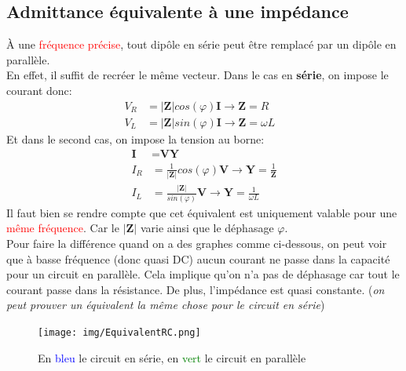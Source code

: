 \documentclass{report}
\begin{document}
\subsection{Admittance équivalente à une impédance}
À une \textcolor{red}{fréquence précise}, tout dipôle en série peut être remplacé par un dipôle en parallèle.\\

En effet, il suffit de recréer le même vecteur. Dans le cas en \textbf{série}, on impose le courant donc:
\begin{align}
\textbf{$V_{R}$} &= |\textbf{Z}|cos(\varphi) \textbf{I} \rightarrow \textbf{Z} = R\\
\textbf{$V_{L}$} &= |\textbf{Z}|sin(\varphi) \textbf{I} \rightarrow \textbf{Z} = \omega L&
\end{align}
Et dans le second cas, on impose la tension au borne:
\begin{align}
\textbf{I} &= \textbf{V} \textbf{Y}\\
\textbf{$I_{R}$} &= \frac{1}{|\textbf{Z}|}cos(\varphi) \textbf{V} \rightarrow \textbf{Y} = \frac{1}{\textbf{Z}}\\
\textbf{$I_{L}$} &= \frac{|\textbf{Z}|}{sin(\varphi)} \textbf{V} \rightarrow \textbf{Y} = \frac{1}{\omega L} 
\end{align}
Il faut bien se rendre compte que cet équivalent est uniquement valable pour une \textcolor{red}{même fréquence}. Car le $|\textbf{Z}|$ varie ainsi que le déphasage $\varphi$. \\
Pour faire la différence quand on a des graphes comme ci-dessous, on peut voir que à basse fréquence (donc quasi DC) aucun courant ne passe dans la capacité pour un circuit en parallèle. Cela implique qu'on n'a pas de déphasage car tout le courant passe dans 	la résistance. De plus, l'impédance est quasi constante. (\textit{on peut prouver un équivalent la même chose pour le circuit en série})

\begin{figure}[H]
\centering
\texttt{[image: img/EquivalentRC.png]}
\caption{En \textcolor{blue}{bleu} le circuit en série, en \textcolor{green}{vert} le circuit en parallèle}
\end{figure}
\end{document}
